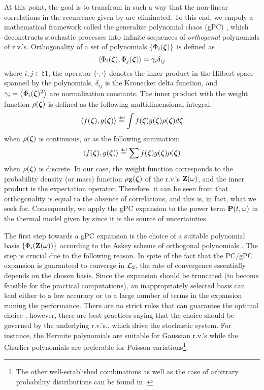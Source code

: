 At this point, the goal is to transfrom  in such a way that the non-linear correlations in the recurrence given by  are eliminated. To this end, we empoly a mathematical framework called the generalize polynomial chaos (gPC) \cite{xiu2002}, which deconstructs stochastic processes into infinite sequences of \emph{orthogonal} polynomials of r.v.'s. Orthogonality of a set of polynomials $\{ \Phi_i(\boldsymbol{\zeta}) \}$ is defined as
\begin{equation} \elabel{orthogonality}
  \oInner{\pcb_i(\vz)}{\pcb_j(\vz)} = \pcn_i \delta_{ij}
\end{equation}
where $i,j \in \natural{1}$, the operator $\oInner{\cd}{\cd}$ denotes the inner product in the Hilbert space spanned by the polynomials, $\delta_{ij}$ is the Kronecker delta function, and $\pcn_i = \oInner{\pcb_i(\vz)^2}$ are normalization constants. The inner product with the weight function $\rho(\boldsymbol{\zeta})$ is defined as the following multidimensional integral:
\begin{equation} \elabel{inner-product-integral}
  \oInner{f(\vz)}{g(\vz)} \eqdef \int f(\vz) g(\vz) \pdf(\vz) d\vz
\end{equation}
when $\rho(\boldsymbol{\zeta})$ is continuous, or as the following summation:
\begin{equation} \elabel{inner-product-sum}
  \oInner{f(\vz)}{g(\vz)} \eqdef \sum f(\vz) g(\vz) \pdf(\vz)
\end{equation}
when $\rho(\boldsymbol{\zeta})$ is discrete. In our case, the weight function corresponds to the probability density (or mass) function $\rho_{\mathbf{Z}}(\boldsymbol{\zeta})$ of the r.v.'s $\mathbf{Z}(\omega)$, and the inner product is the expectation operator. Therefore, it can be seen from  that orthogonality is equal to the absence of correlations, and this is, in fact, what we seek for. Consequently, we apply the gPC expansion to the power term $\mathbf{P}(t, \omega)$ in the thermal model given by  since it is the source of uncertainties.

The first step towards a gPC expansion is the choice of a suitable polynomial basis $\{ \Phi_i(\mathbf{Z}(\omega)) \}$ according to the Askey scheme of orthogonal polynomials \cite{xiu2002}. The step is crucial due to the following reason. In spite of the fact that the PC/gPC expansion is guaranteed to converge in $\mathcal{L}_{2}$, the rate of convergence essentially depends on the chosen basis. Since the expansion should be truncated (to become feasible for the practical computations), an inappropriately selected basis can lead either to a low accuracy or to a large number of terms in the expansion ruining the performance. There are no strict rules that can guarantee the optimal choice \cite{knio2006}, however, there are best practices saying that the choice should be governed by the underlying r.v.'s., which drive the stochastic system. For instance, the Hermite polynomials are suitable for Gaussian r.v.'s while the Charlier polynomials are preferable for Poisson variations\footnote{The other well-established combinations as well as the case of arbitrary probability distributions can be found in \cite{xiu2002}.}.

